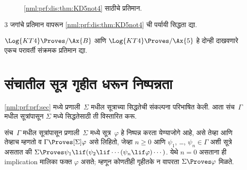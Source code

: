 \begin{figure}[t]
  \centering
  \caption{\ref{nml:prf:dis:thm:KD5not4} साठीचे प्रतिमान.}
  \label{nml:prf:dis:fig:KD5not4}
\end{figure}

\begin{prob}
  $3$ जगांचे प्रतिमान वापरून
  \ref{nml:prf:dis:thm:KD5not4} ची पर्यायी
  सिद्धता द्या.
\end{prob}

\begin{prob}
  $\Log{KT4} \Proves/ \Ax{B}$ आणि
  $\Log{KT4} \Proves/ \Ax{5}$ हे दोन्ही दाखवणारे
  एकच परावर्ती संक्रमक प्रतिमान द्या.
\end{prob}













\section{संचातील सूत्र गृहीत धरून निष्पन्नता}\label{nml:prf:prg:sec}

\ref{nml:prf:prf:sec} मध्ये प्रणाली~$\Sigma$ मधील
सूत्राच्या सिद्धतेची संकल्पना परिभाषित केली.
आता संच~$\Gamma$ मधील सूत्रांपासून
$\Sigma$ मध्ये सिद्धतेसाठी ती विस्तारित करू.

\begin{defn}\label{nml:prf:prg:defn:Gammaproves}
  संच~$\Gamma$ मधील सूत्रांपासून
  प्रणाली~$\Sigma$ मध्ये सूत्र~$\varphi$
  हे निष्पन्न करता येण्याजोगे आहे, असे तेव्हा आणि तेव्हाच
  म्हणतो व $\Gamma \Proves[\Sigma] \varphi$ असे लिहितो,
  जेव्हा $n \geq 0$ आणि $\psi_1$, \dots, $\psi_n \in \Gamma$ अशी
  सूत्रे असतात की
  $\Sigma \Proves \psi_1 \lif (\psi_2 \lif \cdots (\psi_n \lif \varphi)
  \cdots)$.
येथे $n=0$ असताना ही implication मालिका फक्त $\varphi$ असते;
म्हणून कोणतीही गृहीतके न वापरता $\Sigma \Proves \varphi$ मिळते.
\end{defn}












